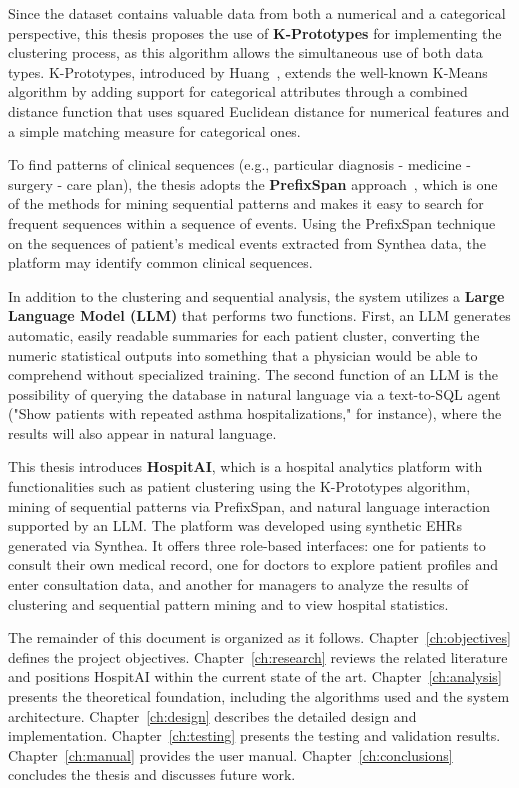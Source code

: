 Since the dataset contains valuable data from both a numerical and a categorical perspective, this thesis proposes the use of \textbf{K-Prototypes} for implementing the clustering process, as this algorithm allows the simultaneous use of both data types. K-Prototypes, introduced by Huang~\cite{huang1998}, extends the well-known K-Means algorithm by adding support for categorical attributes through a combined distance function that uses squared Euclidean distance for numerical features and a simple matching measure for categorical ones.

To find patterns of clinical sequences (e.g., particular diagnosis - medicine - surgery - care plan), the thesis adopts the \textbf{PrefixSpan} approach~\cite{pei2001}, which is one of the methods for mining sequential patterns and makes it easy to search for frequent sequences within a sequence of events. Using the PrefixSpan technique on the sequences of patient’s medical events extracted from Synthea data, the platform may identify common clinical sequences.

In addition to the clustering and sequential analysis, the system utilizes a \textbf{Large Language Model (LLM)} that performs two functions. First, an LLM generates automatic, easily readable summaries for each patient cluster, converting the numeric statistical outputs into something that a physician would be able to comprehend without specialized training. The second function of an LLM is the possibility of querying the database in natural language via a text-to-SQL agent ("Show patients with repeated asthma hospitalizations," for instance), where the results will also appear in natural language.

This thesis introduces \textbf{HospitAI}, which is a hospital analytics platform with functionalities such as patient clustering using the K-Prototypes algorithm, mining of sequential patterns via PrefixSpan, and natural language interaction supported by an LLM. The platform was developed using synthetic EHRs generated via Synthea. It offers three role-based interfaces: one for patients to consult their own medical record, one for doctors to explore patient profiles and enter consultation data, and another for managers to analyze the results of clustering and sequential pattern mining and to view hospital statistics.

The remainder of this document is organized as it follows. Chapter~\ref{ch:objectives} defines the project objectives. Chapter~\ref{ch:research} reviews the related literature and positions HospitAI within the current state of the art. Chapter~\ref{ch:analysis} presents the theoretical foundation, including the algorithms used and the system architecture. Chapter~\ref{ch:design} describes the detailed design and implementation. Chapter~\ref{ch:testing} presents the testing and validation results. Chapter~\ref{ch:manual} provides the user manual. Chapter~\ref{ch:conclusions} concludes the thesis and discusses future work.